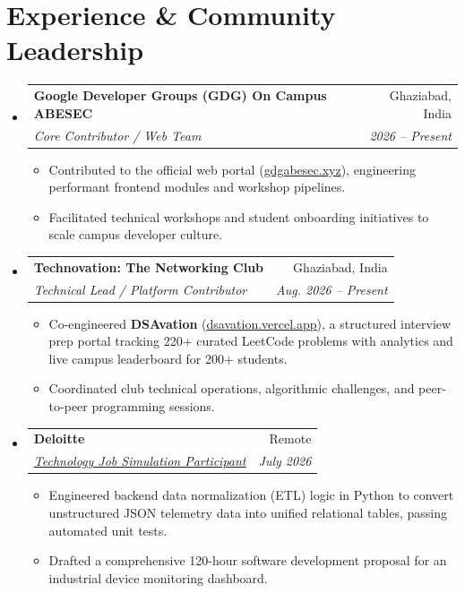 \documentclass[letterpaper,11pt]{article}
\makeatletter
\newcommand{\resumeItem}[1]{
  \item\small{
    {#1 \vspace{-2pt}}
  }
}
\newcommand{\resumeSubheading}[4]{
  \vspace{-2pt}\item
    \begin{tabular*}{0.97\textwidth}[t]{l@{\extracolsep{\fill}}r}
      \textbf{#1} & #2 \\
      \textit{\small#3} & \textit{\small #4} \\
    \end{tabular*}\vspace{-7pt}
}
\newcommand{\resumeSubHeadingListStart}{\begin{itemize}[leftmargin=0.15in, label={}]}
\newcommand{\resumeSubHeadingListEnd}{\end{itemize}}
\newcommand{\resumeItemListStart}{\begin{itemize}}
\newcommand{\resumeItemListEnd}{\end{itemize}\vspace{-5pt}}
\makeatother
\begin{document}
\section{Experience \& Community Leadership}
  \resumeSubHeadingListStart
    \resumeSubheading
      {Google Developer Groups (GDG) On Campus ABESEC}{Ghaziabad, India}
      {Core Contributor / Web Team}{2026 -- Present}
      \resumeItemListStart
        \resumeItem{Contributed to the official web portal (\href{https://gdgabesec.xyz}{\underline{gdgabesec.xyz}}), engineering performant frontend modules and workshop pipelines.}
        \resumeItem{Facilitated technical workshops and student onboarding initiatives to scale campus developer culture.}
      \resumeItemListEnd
    \resumeSubheading
      {Technovation: The Networking Club}{Ghaziabad, India}
      {Technical Lead / Platform Contributor}{Aug. 2026 -- Present}
      \resumeItemListStart
        \resumeItem{Co-engineered \textbf{DSAvation} (\href{https://dsavation.vercel.app}{\underline{dsavation.vercel.app}}), a structured interview prep portal tracking 220+ curated LeetCode problems with analytics and live campus leaderboard for 200+ students.}
        \resumeItem{Coordinated club technical operations, algorithmic challenges, and peer-to-peer programming sessions.}
      \resumeItemListEnd
    \resumeSubheading
      {Deloitte}{Remote}
      {\underline{\href{https://drive.google.com/file/d/1jkFJsC4KCXWQ9cGysLDuxky9i-xQfBZe/view?usp=sharing}{Technology Job Simulation Participant}}}{July 2026}
      \resumeItemListStart
        \resumeItem{Engineered backend data normalization (ETL) logic in Python to convert unstructured JSON telemetry data into unified relational tables, passing automated unit tests.}
        \resumeItem{Drafted a comprehensive 120-hour software development proposal for an industrial device monitoring dashboard.}
      \resumeItemListEnd
  \resumeSubHeadingListEnd

\end{document}
